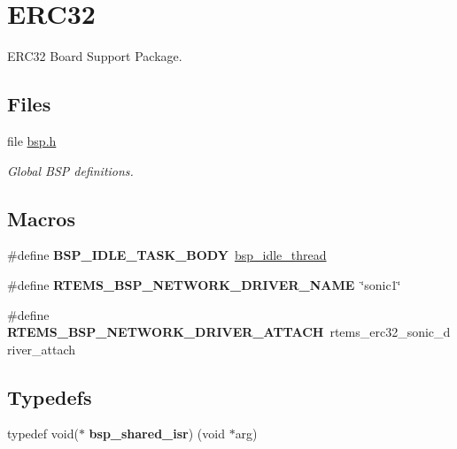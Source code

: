 \hypertarget{group__RTEMSBSPsSPARCERC32}{}\section{E\+R\+C32}
\label{group__RTEMSBSPsSPARCERC32}


E\+R\+C32 Board Support Package.  


\subsection*{Files}
\begin{DoxyCompactItemize}
\item 
file \mbox{\hyperlink{bsps_2sparc_2erc32_2include_2bsp_8h}{bsp.\+h}}
\begin{DoxyCompactList}\small\item\em Global B\+SP definitions. \end{DoxyCompactList}\end{DoxyCompactItemize}
\subsection*{Macros}
\begin{DoxyCompactItemize}
\item 
\mbox{\label{group__RTEMSBSPsSPARCERC32_ga4aa606d0badadcc28e8054cb60f13b56}} 
\#define {\bfseries B\+S\+P\+\_\+\+I\+D\+L\+E\+\_\+\+T\+A\+S\+K\+\_\+\+B\+O\+DY}~\mbox{\hyperlink{group__RTEMSBSPsSPARCLEON3_ga301be7085b80c41a9c5887247003c662}{bsp\+\_\+idle\+\_\+thread}}
\item 
\mbox{\label{group__RTEMSBSPsSPARCERC32_ga86d4f9aa98431100692e31068070a8df}} 
\#define {\bfseries R\+T\+E\+M\+S\+\_\+\+B\+S\+P\+\_\+\+N\+E\+T\+W\+O\+R\+K\+\_\+\+D\+R\+I\+V\+E\+R\+\_\+\+N\+A\+ME}~\char`\"{}sonic1\char`\"{}
\item 
\mbox{\label{group__RTEMSBSPsSPARCERC32_gadde0d66aef9442971dde465292ac14e6}} 
\#define {\bfseries R\+T\+E\+M\+S\+\_\+\+B\+S\+P\+\_\+\+N\+E\+T\+W\+O\+R\+K\+\_\+\+D\+R\+I\+V\+E\+R\+\_\+\+A\+T\+T\+A\+CH}~rtems\+\_\+erc32\+\_\+sonic\+\_\+driver\+\_\+attach
\end{DoxyCompactItemize}
\subsection*{Typedefs}
\begin{DoxyCompactItemize}
\item 
\mbox{\label{group__RTEMSBSPsSPARCERC32_ga5ab827b319fd4d84eebf884a6e2b6a24}} 
typedef void($\ast$ {\bfseries bsp\+\_\+shared\+\_\+isr}) (void $\ast$arg)
\end{DoxyCompactItemize}
